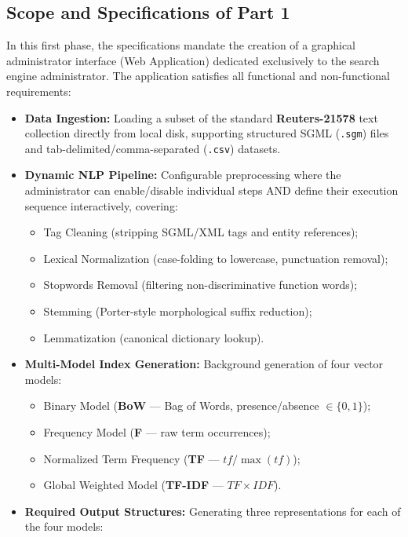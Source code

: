 \documentclass[11pt,a4paper]{article}
\begin{document}
\subsection{Scope and Specifications of Part 1}
In this first phase, the specifications mandate the creation of a graphical administrator interface (Web Application) dedicated exclusively to the search engine administrator. The application satisfies all functional and non-functional requirements:
\begin{itemize}[label=\textcolor{primaryblue}{\textbullet}]
    \item \textbf{Data Ingestion:} Loading a subset of the standard \textbf{Reuters-21578} text collection directly from local disk, supporting structured SGML (\texttt{.sgm}) files and tab-delimited/comma-separated (\texttt{.csv}) datasets.
    \item \textbf{Dynamic NLP Pipeline:} Configurable preprocessing where the administrator can enable/disable individual steps AND define their execution sequence interactively, covering:
    \begin{itemize}
        \item Tag Cleaning (stripping SGML/XML tags and entity references);
        \item Lexical Normalization (case-folding to lowercase, punctuation removal);
        \item Stopwords Removal (filtering non-discriminative function words);
        \item Stemming (Porter-style morphological suffix reduction);
        \item Lemmatization (canonical dictionary lookup).
    \end{itemize}
    \item \textbf{Multi-Model Index Generation:} Background generation of four vector models:
    \begin{itemize}
        \item Binary Model (\textbf{BoW} --- Bag of Words, presence/absence $\in \{0, 1\}$);
        \item Frequency Model (\textbf{F} --- raw term occurrences);
        \item Normalized Term Frequency (\textbf{TF} --- $tf / \max(tf)$);
        \item Global Weighted Model (\textbf{TF-IDF} --- $TF \times IDF$).
    \end{itemize}
    \item \textbf{Required Output Structures:} Generating three representations for each of the four models:

\end{itemize}
\end{document}
